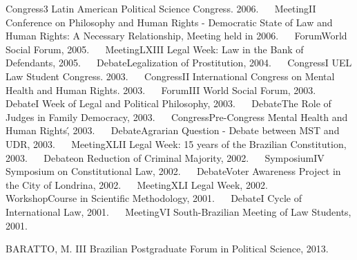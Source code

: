 

\begin{cvcitems}
  \cvcitem
    {Congress}{3 Latin American Political Science Congress. 2006.}
  \cvcitem
    {Meeting}{II Conference on Philosophy and Human Rights - Democratic State of Law and Human Rights: A Necessary Relationship, Meeting held in 2006.}
  \cvcitem
    {Forum}{World Social Forum, 2005.}
  \cvcitem
    {Meeting}{LXIII Legal Week: Law in the Bank of Defendants, 2005.}
  \cvcitem
    {Debate}{Legalization of Prostitution, 2004.}
  \cvcitem
    {Congress}{I UEL Law Student Congress. 2003.}
  \cvcitem
    {Congress}{II International Congress on Mental Health and Human Rights. 2003.}
  \cvcitem
    {Forum}{III World Social Forum, 2003.}
  \cvcitem
    {Debate}{I Week of Legal and Political Philosophy, 2003.}
  \cvcitem
    {Debate}{The Role of Judges in Family Democracy, 2003.}
  \cvcitem
    {Congress}{Pre-Congress \'Mental Health and Human Rights\', 2003.}
  \cvcitem
    {Debate}{Agrarian Question - Debate between MST and UDR, 2003.}
  \cvcitem
    {Meeting}{XLII Legal Week: 15 years of the Brazilian Constitution, 2003.}
  \cvcitem
    {Debate}{on Reduction of Criminal Majority, 2002.}
  \cvcitem
    {Symposium}{IV Symposium on Constitutional Law, 2002.}
  \cvcitem
    {Debate}{Voter Awareness Project in the City of Londrina, 2002.}
  \cvcitem
    {Meeting}{XLI Legal Week, 2002.}
  \cvcitem
    {Workshop}{Course in Scientific Methodology, 2001.}
  \cvcitem
    {Debate}{I Cycle of International Law, 2001.}
  \cvcitem
    {Meeting}{VI South-Brazilian Meeting of Law Students, 2001.}
\end{cvcitems}


\begin{cvcitems}
  \cvcitem
    {BARATTO, M.}
    {III Brazilian Postgraduate Forum in Political Science, 2013.}
\end{cvcitems}
